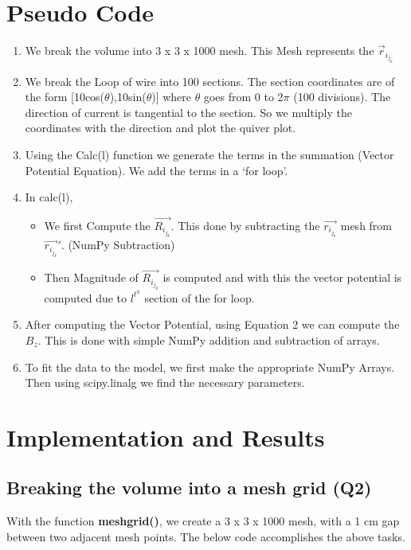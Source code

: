 \documentclass[12pt, a4paper]{report}
\begin{document}
\section{Pseudo Code}
\begin{enumerate}
  \item We break the volume into 3 x 3 x 1000 mesh. This Mesh represents the $\vec{r}_i_j_k$
  \item We break the Loop of wire into 100 sections. The section coordinates are of the form [10cos($\theta$),10sin($\theta$)] where $\theta$ goes from 0 to 2$\pi$ (100 divisions). The direction of current is tangential to the section. So we multiply the coordinates with the direction and plot the quiver plot.
  \item Using the Calc(l) function we generate the terms in the summation (Vector Potential Equation). We add the terms in a ‘for loop’. 
  \item In calc(l),
  \begin{itemize}
      \item We first Compute the $\vec{R_i_j_k}$. This done by subtracting the $\vec{r_i_j_k}$ mesh from $\vec{r_i_j_k}'$. (NumPy Subtraction)
      \item Then Magnitude of $\vec{R_i_j_k}$ is computed and with this the vector potential is computed due to $l^t^h$ section of the for loop.
  \end{itemize}
  \item After computing the Vector Potential, using Equation 2 we can compute the $B_z$. This is done with simple NumPy addition and subtraction of arrays.
  \item To fit the data to the model, we first make the appropriate NumPy Arrays. Then using scipy.linalg we find the necessary parameters.
\end{enumerate}
\section{Implementation and Results}
\subsection{Breaking the volume into a mesh grid (Q2)}
With the function \textbf{meshgrid()}, we create a 3 x 3 x 1000 mesh, with a 1 cm gap between two adjacent mesh points. The below code accomplishes the above tasks.
\noindent

\end{document}
